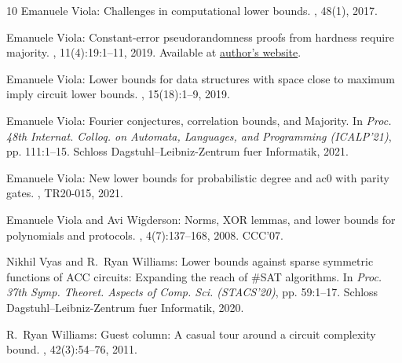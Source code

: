 \documentclass[11pt]{article}
\begin{document}
\begin{thebibliography}{10}
{\sc Emanuele Viola}: Challenges in computational lower bounds.
, 48(1), 2017.
\newblock [\epfmtdoi{10.1145/3061640.3061648}]

{\sc Emanuele Viola}: Constant-error pseudorandomness proofs from hardness
  require majority.
, 11(4):19:1--11, 2019.
\newblock Available at \href{https://www.ccs.neu.edu/home/viola/}{author's
  website}.
\newblock [\epfmtdoi{10.1145/3322815}]

{\sc Emanuele Viola}: Lower bounds for data structures with space close to
  maximum imply circuit lower bounds.
, 15(18):1--9, 2019.

{\sc Emanuele Viola}: Fourier conjectures, correlation bounds, and {M}ajority.
\newblock In {\em Proc. 48th Internat. Colloq. on Automata, Languages, and
  Programming (ICALP'21)}, pp. 111:1--15. Schloss Dagstuhl--Leibniz-Zentrum
  fuer Informatik, 2021.

{\sc Emanuele Viola}: New lower bounds for probabilistic degree and ac0 with
  parity gates.
, TR20-015, 2021.

{\sc Emanuele Viola and Avi Wigderson}: Norms, {XOR} lemmas, and lower bounds
  for polynomials and protocols.
, 4(7):137--168, 2008.
\newblock \prelim CCC'07.

{\sc Nikhil Vyas and R.~Ryan Williams}: Lower bounds against sparse symmetric
  functions of {ACC} circuits: {E}xpanding the reach of \#{SAT} algorithms.
\newblock In {\em Proc. 37th Symp. Theoret. Aspects of Comp. Sci. (STACS'20)},
  pp. 59:1--17. Schloss Dagstuhl--Leibniz-Zentrum fuer Informatik, 2020.

{\sc R.~Ryan Williams}: Guest column: {A} casual tour around a circuit
  complexity bound.
, 42(3):54--76, 2011.
\newblock [\epfmtdoi{10.1145/2034575.2034591}]


\end{thebibliography}
\end{document}
